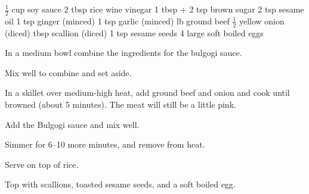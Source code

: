 \dishtype{\main}
\begin{ingreds}
        $\frac{1}{2}$ cup soy sauce
        2 tbsp rice wine vinegar
        1 tbsp + 2 tsp brown sugar
        2 tsp sesame oil
        1 tsp ginger (minced)
        1 tsp garlic (minced)    
    \columnbreak{}
     lb ground beef
        $\frac{1}{2}$ yellow onion (diced)
    \smallbreak{}
     tbsp scallion (diced)
        1 tsp sesame seeds
        4 large soft boiled eggs
\end{ingreds}
\begin{method}
    In a medium bowl combine the ingredients for the bulgogi sauce.\par
    Mix well to combine and set aside.\par
    In a skillet over medium-high heat, add ground beef and onion and cook until browned (about 5 minutes). The meat will still be a little pink.\par
    Add the Bulgogi sauce and mix well.\par
    Simmer for 6--10 more minutes, and remove from heat.\par
    Serve on top of rice.\par
    Top with scallions, toasted sesame seeds, and a soft boiled egg.
\end{method}